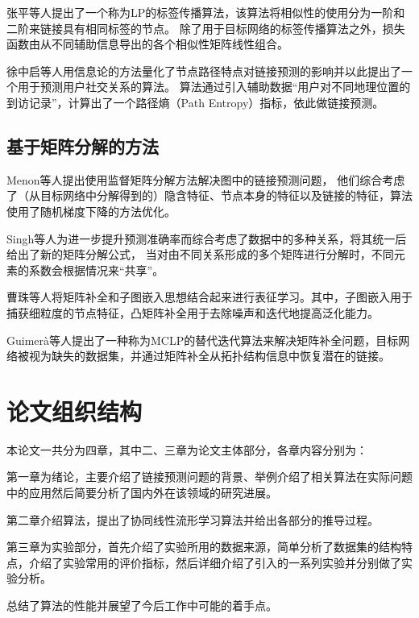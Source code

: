 张平等人提出了一个称为LP的标签传播算法\cite{zhang2015label}，该算法将相似性的使用分为一阶和二阶来链接具有相同标签的节点。
除了用于目标网络的标签传播算法之外，损失函数由从不同辅助信息导出的各个相似性矩阵线性组合。

徐中启等人用信息论的方法量化了节点路径特点对链接预测的影响并以此提出了一个用于预测用户社交关系的算法。
算法通过引入辅助数据“用户对不同地理位置的到访记录”，计算出了一个路径熵（Path Entropy）指标，依此做链接预测\cite{xu2016link}。

\subsection{基于矩阵分解的方法}
Menon等人提出使用监督矩阵分解方法解决图中的链接预测问题，
他们综合考虑了（从目标网络中分解得到的）隐含特征、节点本身的特征以及链接的特征，算法使用了随机梯度下降的方法优化\cite{singh2008relational}。

Singh等人为进一步提升预测准确率而综合考虑了数据中的多种关系，将其统一后给出了新的矩阵分解公式，
当对由不同关系形成的多个矩阵进行分解时，不同元素的系数会根据情况来“共享”。

曹珠等人将矩阵补全和子图嵌入思想结合起来进行表征学习。其中，子图嵌入用于捕获细粒度的节点特征，凸矩阵补全用于去除噪声和迭代地提高泛化能力\cite{cao2018link}。

Guimerà等人提出了一种称为MCLP的替代迭代算法来解决矩阵补全问题，目标网络被视为缺失的数据集，并通过矩阵补全从拓扑结构信息中恢复潜在的链接\cite{guimera2009missing}。

\section{论文组织结构}
本论文一共分为四章，其中二、三章为论文主体部分，各章内容分别为：

第一章为绪论，主要介绍了链接预测问题的背景、举例介绍了相关算法在实际问题中的应用然后简要分析了国内外在该领域的研究进展。

第二章介绍算法，提出了协同线性流形学习算法并给出各部分的推导过程。

第三章为实验部分，首先介绍了实验所用的数据来源，简单分析了数据集的结构特点，介绍了实验常用的评价指标，然后详细介绍了引入的一系列实验并分别做了实验分析。

总结了算法的性能并展望了今后工作中可能的着手点。